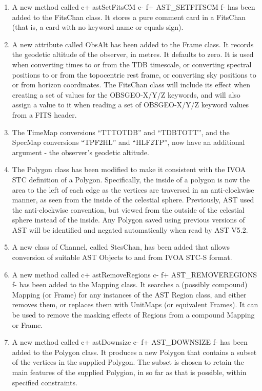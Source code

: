 \documentclass[twoside,11pt]{article}
\begin{document}
\begin{enumerate}

\item A new method called
c+
astSetFitsCM
c-
f+
AST\_SETFITSCM
f-
has been added to the FitsChan class. It stores a pure comment card in a
FitsChan (that is, a card with no keyword name or equals sign).

\item A new attribute called ObsAlt has been added to the Frame class. It
records the geodetic altitude of the observer, in metres. It defaults to
zero. It is used when converting times to or from the TDB timescale, or
converting spectral positions to or from the topocentric rest frame, or
converting sky positions to or from horizon coordinates. The FitsChan
class will include its effect when creating a set of values for the
OBSGEO-X/Y/Z keywords, and will also assign a value to it when reading a
set of OBSGEO-X/Y/Z keyword values from a FITS header.

\item The TimeMap conversions ``TTTOTDB'' and ``TDBTOTT'', and the SpecMap
conversions ``TPF2HL'' and ``HLF2TP'', now have an additional argument -
the observer's geodetic altitude.

\item The Polygon class has been modified to make it consistent with the
IVOA STC definition of a Polygon. Specifically, the inside of a polygon
is now the area to the left of each edge as the vertices are traversed in
an anti-clockwise manner, as seen from the inside of the celestial sphere.
Previously, AST used the anti-clockwise convention, but viewed from the
outside of the celestial sphere instead of the inside. Any Polygon saved
using previous versions of AST will be identified and negated automatically
when read by AST V5.2.

\item A new class of Channel, called StcsChan, has been added that allows
conversion of suitable AST Objects to and from IVOA STC-S format.

\item A new method called
c+
astRemoveRegions
c-
f+
AST\_REMOVEREGIONS
f-
has been added to the Mapping class. It searches a (possibly compound)
Mapping (or Frame) for any instances of the AST Region class, and either
removes them, or replaces them with UnitMaps (or equivalent Frames). It
can be used to remove the masking effects of Regions from a compound
Mapping or Frame.

\item A new method called
c+
astDownsize
c-
f+
AST\_DOWNSIZE
f-
has been added to the Polygon class. It produces a new Polygon that
contains a subset of the vertices in the supplied Polygon. The subset is
chosen to retain the main features of the supplied Polygion, in so far
as that is possible, within specified constraints.


\end{enumerate}
\end{document}
